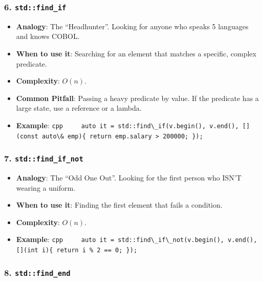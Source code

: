 \hypertarget{stdfind_if}{%
\subsubsection{\texorpdfstring{6.
\texttt{std::find\_if}}{6. std::find\_if}}\label{stdfind_if}}

\begin{itemize}
\tightlist
\item
  \textbf{Analogy}: The ``Headhunter''. Looking for anyone who speaks 5
  languages and knows COBOL.
\item
  \textbf{When to use it}: Searching for an element that matches a
  specific, complex predicate.
\item
  \textbf{Complexity}: \(O(n)\).
\item
  \textbf{Common Pitfall}: Passing a heavy predicate by value. If the
  predicate has a large state, use a reference or a lambda.
\item
  \textbf{Example}:
  \passthrough{\lstinline!cpp     auto it = std::find\_if(v.begin(), v.end(), [](const auto\& emp)\{ return emp.salary > 200000; \});!}
\end{itemize}

\hypertarget{stdfind_if_not}{%
\subsubsection{\texorpdfstring{7.
\texttt{std::find\_if\_not}}{7. std::find\_if\_not}}\label{stdfind_if_not}}

\begin{itemize}
\tightlist
\item
  \textbf{Analogy}: The ``Odd One Out''. Looking for the first person
  who ISN'T wearing a uniform.
\item
  \textbf{When to use it}: Finding the first element that fails a
  condition.
\item
  \textbf{Complexity}: \(O(n)\).
\item
  \textbf{Example}:
  \passthrough{\lstinline!cpp     auto it = std::find\_if\_not(v.begin(), v.end(), [](int i)\{ return i \% 2 == 0; \});!}
\end{itemize}

\hypertarget{stdfind_end}{%
\subsubsection{\texorpdfstring{8.
\texttt{std::find\_end}}{8. std::find\_end}}\label{stdfind_end}}

